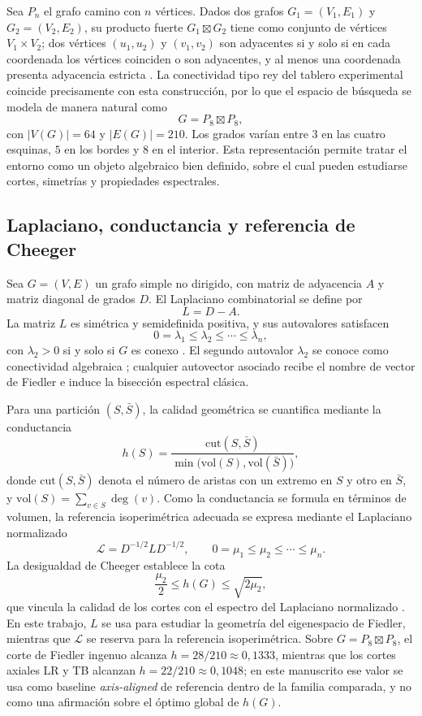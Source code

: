 \documentclass[journal]{IEEEtran}
\newcommand{\vol}{\mathrm{vol}}
\newcommand{\cut}{\mathrm{cut}}
\begin{document}
Sea $P_n$ el grafo camino con $n$ vértices. Dados dos grafos $G_1=(V_1,E_1)$ y $G_2=(V_2,E_2)$, su producto fuerte $G_1 \boxtimes G_2$ tiene como conjunto de vértices $V_1\times V_2$; dos vértices $(u_1,u_2)$ y $(v_1,v_2)$ son adyacentes si y solo si en cada coordenada los vértices coinciden o son adyacentes, y al menos una coordenada presenta adyacencia estricta \cite{hammack2011}. La conectividad tipo rey del tablero experimental coincide precisamente con esta construcción, por lo que el espacio de búsqueda se modela de manera natural como
\[
G = P_8 \boxtimes P_8,
\]
con $|V(G)|=64$ y $|E(G)|=210$. Los grados varían entre $3$ en las cuatro esquinas, $5$ en los bordes y $8$ en el interior. Esta representación permite tratar el entorno como un objeto algebraico bien definido, sobre el cual pueden estudiarse cortes, simetrías y propiedades espectrales.

\subsection{Laplaciano, conductancia y referencia de Cheeger}

Sea $G=(V,E)$ un grafo simple no dirigido, con matriz de adyacencia $A$ y matriz diagonal de grados $D$. El Laplaciano combinatorial se define por
\[
L = D - A.
\]
La matriz $L$ es simétrica y semidefinida positiva, y sus autovalores satisfacen
\[
0 = \lambda_1 \le \lambda_2 \le \cdots \le \lambda_n,
\]
con $\lambda_2 > 0$ si y solo si $G$ es conexo \cite{chung1997,vonluxburg2007}. El segundo autovalor $\lambda_2$ se conoce como conectividad algebraica \cite{fiedler1973,mohar1991}; cualquier autovector asociado recibe el nombre de vector de Fiedler e induce la bisección espectral clásica.

Para una partición $(S,\bar S)$, la calidad geométrica se cuantifica mediante la conductancia
\begin{equation}
h(S) = \frac{\cut(S,\bar S)}{\min\bigl(\vol(S),\vol(\bar S)\bigr)},
\label{eq:conductance}
\end{equation}
donde $\cut(S,\bar S)$ denota el número de aristas con un extremo en $S$ y otro en $\bar S$, y $\vol(S)=\sum_{v\in S}\deg(v)$. Como la conductancia se formula en términos de volumen, la referencia isoperimétrica adecuada se expresa mediante el Laplaciano normalizado
\[
\mathcal{L} = D^{-1/2} L D^{-1/2}, \qquad 0 = \mu_1 \le \mu_2 \le \cdots \le \mu_n.
\]
La desigualdad de Cheeger establece la cota
\begin{equation}
\frac{\mu_2}{2} \le h(G) \le \sqrt{2\mu_2},
\label{eq:cheeger}
\end{equation}
que vincula la calidad de los cortes con el espectro del Laplaciano normalizado \cite{chung1997,cheeger1970}. En este trabajo, $L$ se usa para estudiar la geometría del eigenespacio de Fiedler, mientras que $\mathcal{L}$ se reserva para la referencia isoperimétrica. Sobre $G = P_8 \boxtimes P_8$, el corte de Fiedler ingenuo alcanza $h = 28/210 \approx 0{,}1333$, mientras que los cortes axiales LR y TB alcanzan $h = 22/210 \approx 0{,}1048$; en este manuscrito ese valor se usa como baseline \emph{axis-aligned} de referencia dentro de la familia comparada, y no como una afirmación sobre el óptimo global de $h(G)$.
\end{document}
